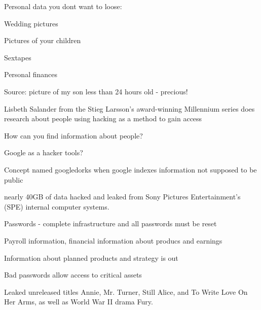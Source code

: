 \documentclass[20pt,landscape,a4paper,footrule]{foils}
\begin{document}

\begin{list1}
\item Personal data you dont want to loose:
\begin{list2}
\item Wedding pictures
\item Pictures of your children
\item Sextapes
\item Personal finances
\end{list2}
\end{list1}

Source: picture of my son less than 24 hours old - precious!



\begin{list1}
\item Lisbeth Salander from the Stieg Larsson's award-winning Millennium series
does research about people using hacking as a method to gain access
\item How can you find information about people?
\end{list1}




\begin{list1}
\item Google as a hacker tools?
\item Concept named googledorks when google indexes information not supposed to be public
\end{list1}




{\small{}}



\begin{list1}
\item  nearly 40GB of data hacked and leaked from Sony Pictures Entertainment's (SPE) internal computer systems.
\item Passwords - complete infrastructure and all passwords must be reset
\item Payroll information, financial information about producs and earnings
\item Information about planned products and strategy is out
\item Bad passwords allow access to critical assets
\item Leaked unreleased titles Annie, Mr. Turner, Still Alice, and To Write Love On Her Arms, as well as World War II drama Fury.
\end{list1}
\end{document}
